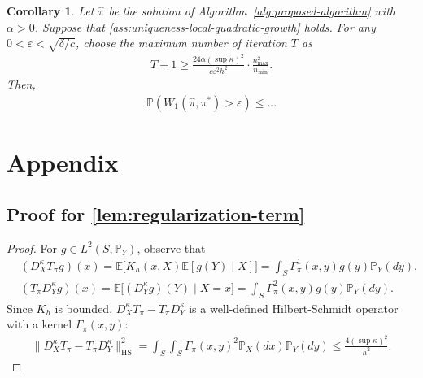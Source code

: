 \documentclass{article}
\newtheorem{corollary}{Corollary}
\begin{document}
\begin{corollary}
	Let $\hat{\pi}$ be the solution of Algorithm~\ref{alg:proposed-algorithm} with $\alpha > 0$. Suppose that \cref{ass:uniqueness-local-quadratic-growth} holds. For any $0 < \varepsilon < \sqrt{\delta/c}$, choose the maximum number of iteration $T$ as
	\begin{align*}
		T + 1 \geq \frac{24\alpha(\sup\kappa)^2}{c\varepsilon^2 h^2} \cdot \frac{n_{\max}^2}{n_{\min}} .
	\end{align*}
	Then,
	\begin{align*}
		\mathbb{P}\left(W_1(\hat{\pi},\pi^\ast) > \varepsilon \right) \leq ...
	\end{align*}
\end{corollary}






\appendix
\section{Appendix}
\subsection{Proof for \cref{lem:regularization-term}}\label{pf:lem:regularization-term}
\begin{proof}
	For $g \in L^2(S,\mathbb{P}_Y)$, observe that
	\begin{align*}
		&(D_X^{\kappa}T_{\pi}g)(x) = \mathbb{E}\Big[K_h(x,X)\mathbb{E}\left[g(Y) \mid X\right]\Big] = \int_S \Gamma_\pi^1(x,y)g(y)\mathbb{P}_Y(dy) , \\
		&(T_{\pi}D_Y^{\kappa}g)(x) = \mathbb{E}\Big[(D_Y^{\kappa}g)(Y) \mid X = x\Big] = \int_S \Gamma_\pi^2(x,y)g(y) \mathbb{P}_Y(dy) .
	\end{align*}
	Since $K_h$ is bounded, $D_X^{\kappa}T_{\pi} - T_{\pi}D_Y^{\kappa}$ is a well-defined Hilbert-Schmidt operator with a kernel $\Gamma_\pi(x,y)$:
	\begin{align*}
		\| D_X^{\kappa}T_{\pi} - T_{\pi}D_Y^{\kappa} \|_{\mathrm{HS}}^2 = \int_S\int_S \Gamma_\pi(x,y)^2\mathbb{P}_X(dx)\mathbb{P}_Y(dy) \leq \frac{4(\sup\kappa)^2}{h^2} .
	\end{align*}
\end{proof}
\end{document}
